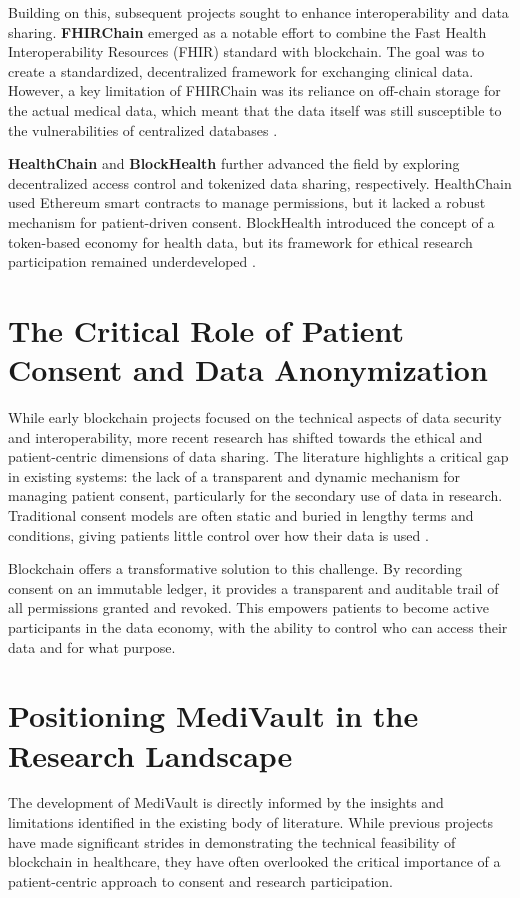 Building on this, subsequent projects sought to enhance interoperability and data sharing. \textbf{FHIRChain} emerged as a notable effort to combine the Fast Health Interoperability Resources (FHIR) standard with blockchain. The goal was to create a standardized, decentralized framework for exchanging clinical data. However, a key limitation of FHIRChain was its reliance on off-chain storage for the actual medical data, which meant that the data itself was still susceptible to the vulnerabilities of centralized databases \autocite{zhang2018fhirchain}.

\textbf{HealthChain} and \textbf{BlockHealth} further advanced the field by exploring decentralized access control and tokenized data sharing, respectively. HealthChain used Ethereum smart contracts to manage permissions, but it lacked a robust mechanism for patient-driven consent. BlockHealth introduced the concept of a token-based economy for health data, but its framework for ethical research participation remained underdeveloped \autocite{hylock2019blockchain, griggs2018blockhealth}.

\section{The Critical Role of Patient Consent and Data Anonymization}
While early blockchain projects focused on the technical aspects of data security and interoperability, more recent research has shifted towards the ethical and patient-centric dimensions of data sharing. The literature highlights a critical gap in existing systems: the lack of a transparent and dynamic mechanism for managing patient consent, particularly for the secondary use of data in research. Traditional consent models are often static and buried in lengthy terms and conditions, giving patients little control over how their data is used \autocite{abdel2023blockchain}.

Blockchain offers a transformative solution to this challenge. By recording consent on an immutable ledger, it provides a transparent and auditable trail of all permissions granted and revoked. This empowers patients to become active participants in the data economy, with the ability to control who can access their data and for what purpose.

\section{Positioning MediVault in the Research Landscape}
The development of MediVault is directly informed by the insights and limitations identified in the existing body of literature. While previous projects have made significant strides in demonstrating the technical feasibility of blockchain in healthcare, they have often overlooked the critical importance of a patient-centric approach to consent and research participation.

